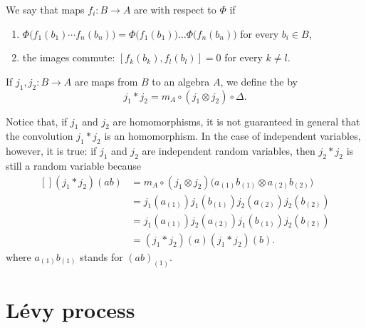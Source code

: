 \begin{definition}
    We say that maps $f_i\colon B\to A$ are  with respect to $\Phi$ if
    \begin{enumerate}
        \item
            $\Phi\big( f_1(b_1)\cdots f_n(b_n) \big)=\Phi\big( f_1(b_1) \big)\ldots\Phi\big( f_n(b_n) \big)$ for every $b_i\in B$,
        \item
            the images commute: $[f_k(b_k),f_l(b_l)]=0$ for every $k\neq l$.
    \end{enumerate}
\end{definition}

If $j_1,j_2\colon B\to A$ are maps from $B$ to an algebra $A$, we define the  by
\begin{equation}
    j_1*j_2=m_A\circ(j_1\otimes j_2)\circ\Delta.
\end{equation}

Notice that, if $j_1$ and $j_2$ are homomorphisms, it is not guaranteed in general that the convolution $j_1*j_2$ is an homomorphism. In the case of independent variables, however, it is true: if $j_1$ and $j_2$ are independent random variables, then $j_2*j_2$ is still a random variable because
\begin{equation}
    \begin{aligned}[]
        (j_1*j_2)(ab)&=m_A\circ(j_1\otimes j_2)\big( a_{(1)}b_{(1)}\otimes a_{(2)}b_{(2)} \big)\\
        &=j_1(a_{(1)})j_1(b_{(1)})j_2(a_{(2)})j_2(b_{(2)})\\
        &=j_1(a_{(1)})j_2(a_{(2)})j_1(b_{(1)})j_2(b_{(2)})\\
        &=(j_1*j_2)(a)(j_1*j_2)(b).
    \end{aligned}
\end{equation}
where $a_{(1)}b_{(1)}$ stands for $(ab)_{(1)}$.

\section{Lévy process}

